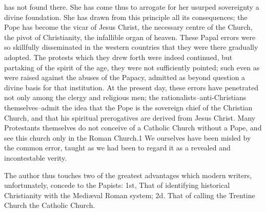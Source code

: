 has not found there. She has come thus to arrogate for her usurped sovereignty a divine foundation. She has drawn from this principle all its consequences; the Pope has become the vicar of Jesus Christ, the necessary centre of the Church, the pivot of Christianity, the infallible organ of heaven. These Papal errors were so skillfully disseminated in the western countries that they were there gradually adopted. The protests which they drew forth were indeed continued, but partaking of the spirit of the age, they were not sufficiently pointed; such even as were raised against the abuses of the Papacy, admitted as beyond question a divine basis for that institution. At the present day, these errors have penetrated not only among the clergy and religious men; the rationalists--anti-Christians themselves--admit the idea that the Pope is the sovereign chief of the Christian Church, and that his spiritual prerogatives are derived from Jesus Christ. Many Protestants themselves do not conceive of a Catholic Church without a Pope, and see this church only in the Roman Church.1 We ourselves have been misled by the common error, taught as we had been to regard it as a revealed and incontestable verity.

The author thus touches two of the greatest advantages which modern writers, unfortunately, concede to the Papists: 1st, That of identifying historical Christianity with the Mediæval Roman system; 2d. That of calling the Trentine Church the Catholic Church.

